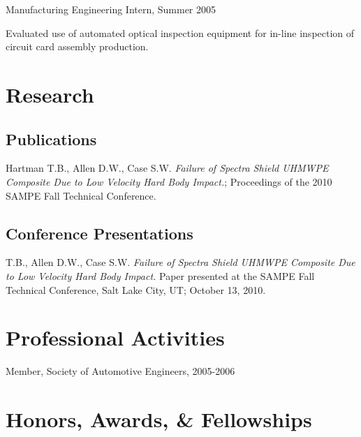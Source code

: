 \documentclass[10pt,letterpaper]{article}
\renewenvironment{itemize}{
  \begin{list}{}{
    \setlength{\leftmargin}{1.5em}
    \setlength{\itemsep}{0.25em}
    \setlength{\parskip}{0pt}
    \setlength{\parsep}{0.25em}
  }
}{
  \end{list}
}
\begin{document}
\begin{itemize}
\item Manufacturing Engineering Intern, Summer 2005
    \begin{itemize}
    \item Evaluated use of automated optical inspection equipment for in-line inspection of circuit card assembly production.
    \end{itemize}
\end{itemize}

%
%

\section*{Research}

\subsection*{Publications}
\begin{itemize}
\item Hartman T.B., Allen D.W., Case S.W. \textit{Failure of Spectra Shield UHMWPE Composite Due to Low Velocity Hard Body Impact.}; Proceedings of the 2010 SAMPE Fall Technical Conference.
\end{itemize}

\subsection*{Conference Presentations}
\begin{itemize}
\item T.B., Allen D.W., Case S.W. \textit{Failure of Spectra Shield UHMWPE Composite Due to Low Velocity Hard Body Impact.} Paper presented at the SAMPE Fall Technical Conference, Salt Lake City, UT; October 13, 2010.
\end{itemize}

%
%

\section*{Professional Activities}
\begin{itemize}
\item Member, Society of Automotive Engineers, 2005-2006
\end{itemize}

\section*{Honors, Awards, \& Fellowships}
\end{document}
